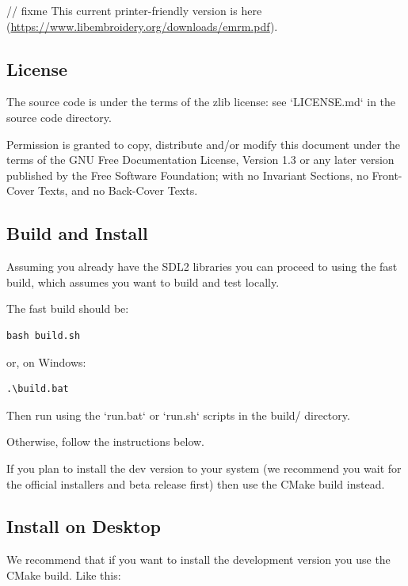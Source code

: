 \documentclass[10pt]{report}
\begin{document}
// fixme
This current printer-friendly version
is here (\url{https://www.libembroidery.org/downloads/emrm.pdf}).

\subsection{License}

The source code is under the terms of the zlib license: see `LICENSE.md`
in the source code directory.

Permission is granted to copy, distribute and/or modify this document
under the terms of the GNU Free Documentation License, Version 1.3
or any later version published by the Free Software Foundation;
with no Invariant Sections, no Front-Cover Texts, and no Back-Cover Texts.


\subsection{Build and Install}

Assuming you already have the SDL2 libraries you can proceed to using the fast build, which
assumes you want to build and test locally.

The fast build should be:

\begin{verbatim}
bash build.sh
\end{verbatim}

or, on Windows:

\begin{verbatim}
.\build.bat
\end{verbatim}

Then run using the `run.bat` or `run.sh` scripts in the build/ directory.

Otherwise, follow the instructions below.

If you plan to install the dev version to your system (we recommend you wait
for the official installers and beta release first) then use the CMake build
instead.

\subsection{Install on Desktop}

We recommend that if you want to install the development version you use the CMake build. Like
this:
\end{document}
